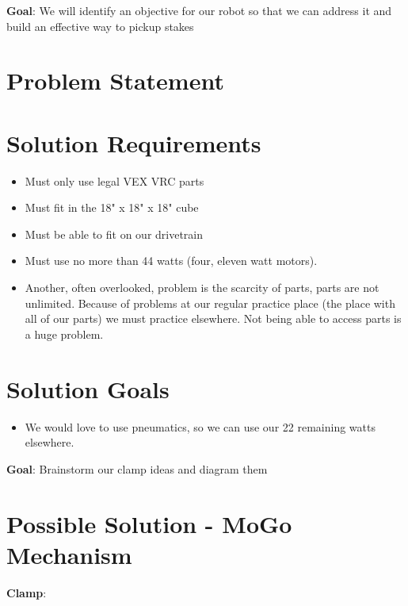 \label{Identify-the-Challenge-&-Set-Goals:-Clamp}
\textbf{Goal}: We will identify an objective for our robot so that we can address it and build an effective way to pickup stakes
\section*{Problem Statement}
\section*{Solution Requirements}
\begin{itemize}
    \item Must only use legal VEX VRC parts
    \item Must fit in the 18" x 18" x 18" cube
    \item Must be able to fit on our drivetrain 
    \item Must use no more than 44 watts (four, eleven watt motors). 
    \item Another, often overlooked, problem is the scarcity of parts, parts are not unlimited. Because of problems at our regular practice place (the place with all of our parts) we must practice elsewhere. Not being able to access  parts is a huge problem.
\end{itemize}
\section*{Solution Goals}
\begin{itemize}
    \item We would love to use pneumatics, so we can use our 22 remaining watts elsewhere.
\end{itemize}
\label{Brainstorm-&-Diagram:-Clamp}
\textbf{Goal}: Brainstorm our clamp ideas and diagram them
\section*{Possible Solution - MoGo Mechanism}
\noindent
\textbf{Clamp}:

